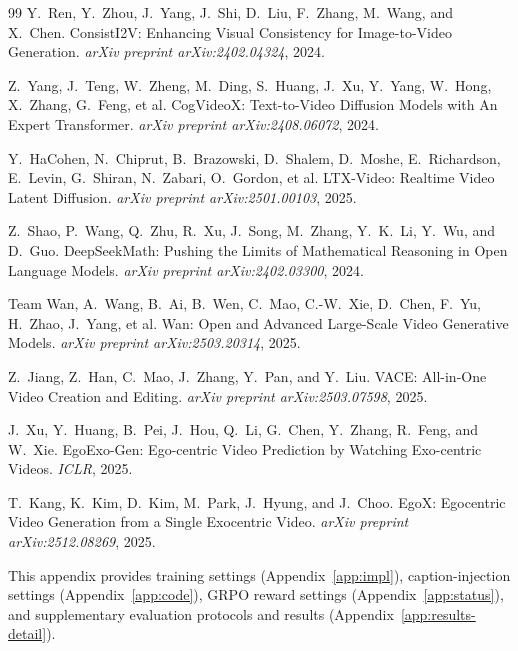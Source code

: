 \documentclass{article} %
\begin{document}
\begin{thebibliography}{99}
Y.\ Ren, Y.\ Zhou, J.\ Yang, J.\ Shi, D.\ Liu, F.\ Zhang, M.\ Wang, and
X.\ Chen.
\newblock ConsistI2V: Enhancing Visual Consistency for Image-to-Video
Generation.
\newblock \emph{arXiv preprint arXiv:2402.04324}, 2024.

Z.\ Yang, J.\ Teng, W.\ Zheng, M.\ Ding, S.\ Huang, J.\ Xu, Y.\ Yang, W.\ Hong,
X.\ Zhang, G.\ Feng, et al.
\newblock CogVideoX: Text-to-Video Diffusion Models with An Expert
Transformer.
\newblock \emph{arXiv preprint arXiv:2408.06072}, 2024.

Y.\ HaCohen, N.\ Chiprut, B.\ Brazowski, D.\ Shalem, D.\ Moshe, E.\ Richardson,
E.\ Levin, G.\ Shiran, N.\ Zabari, O.\ Gordon, et al.
\newblock LTX-Video: Realtime Video Latent Diffusion.
\newblock \emph{arXiv preprint arXiv:2501.00103}, 2025.

Z.\ Shao, P.\ Wang, Q.\ Zhu, R.\ Xu, J.\ Song, M.\ Zhang, Y.\ K.\ Li, Y.\ Wu,
and D.\ Guo.
\newblock DeepSeekMath: Pushing the Limits of Mathematical Reasoning in Open
Language Models.
\newblock \emph{arXiv preprint arXiv:2402.03300}, 2024.

Team Wan, A.\ Wang, B.\ Ai, B.\ Wen, C.\ Mao, C.-W.\ Xie, D.\ Chen, F.\ Yu,
H.\ Zhao, J.\ Yang, et al.
\newblock Wan: Open and Advanced Large-Scale Video Generative Models.
\newblock \emph{arXiv preprint arXiv:2503.20314}, 2025.

Z.\ Jiang, Z.\ Han, C.\ Mao, J.\ Zhang, Y.\ Pan, and Y.\ Liu.
\newblock VACE: All-in-One Video Creation and Editing.
\newblock \emph{arXiv preprint arXiv:2503.07598}, 2025.

J.\ Xu, Y.\ Huang, B.\ Pei, J.\ Hou, Q.\ Li, G.\ Chen, Y.\ Zhang, R.\ Feng, and
W.\ Xie.
\newblock EgoExo-Gen: Ego-centric Video Prediction by Watching Exo-centric
Videos.
\newblock \emph{ICLR}, 2025.

T.\ Kang, K.\ Kim, D.\ Kim, M.\ Park, J.\ Hyung, and J.\ Choo.
\newblock EgoX: Egocentric Video Generation from a Single Exocentric Video.
\newblock \emph{arXiv preprint arXiv:2512.08269}, 2025.

\end{thebibliography}

\appendix

This appendix provides training settings
(Appendix~\ref{app:impl}), caption-injection settings
(Appendix~\ref{app:code}), GRPO reward settings
(Appendix~\ref{app:status}), and supplementary evaluation protocols
and results (Appendix~\ref{app:results-detail}).
\end{document}
